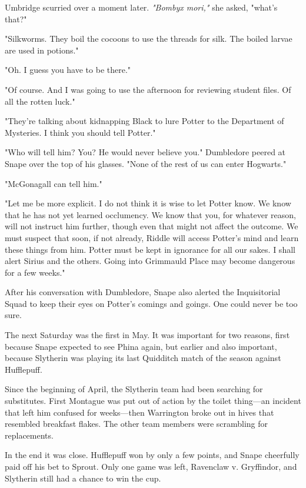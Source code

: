 Umbridge scurried over a moment later. \emph{"Bombyx mori,"} she asked, "what's that?"

"Silkworms. They boil the cocoons to use the threads for silk. The boiled larvae are used in potions."

"Oh. I guess you have to be there."

"Of course. And I was going to use the afternoon for reviewing student files. Of all the rotten luck."

\sbreak

"They're talking about kidnapping Black to lure Potter to the Department of Mysteries. I think you should tell Potter."

"Who will tell him? You? He would never believe you." Dumbledore peered at Snape over the top of his glasses. "None of the rest of us can enter Hogwarts."

"McGonagall can tell him."

"Let me be more explicit. I do not think it is wise to let Potter know. We know that he has not yet learned occlumency. We know that you, for whatever reason, will not instruct him further, though even that might not affect the outcome. We must suspect that soon, if not already, Riddle will access Potter's mind and learn these things from him. Potter must be kept in ignorance for all our sakes. I shall alert Sirius and the others. Going into Grimmauld Place may become dangerous for a few weeks."

After his conversation with Dumbledore, Snape also alerted the Inquisitorial Squad to keep their eyes on Potter's comings and goings. One could never be too sure.

The next Saturday was the first in May. It was important for two reasons, first because Snape expected to see Phina again, but earlier and also important, because Slytherin was playing its last Quidditch match of the season against Hufflepuff.

Since the beginning of April, the Slytherin team had been searching for substitutes. First Montague was put out of action by the toilet thing—an incident that left him confused for weeks—then Warrington broke out in hives that resembled breakfast flakes. The other team members were scrambling for replacements.

In the end it was close. Hufflepuff won by only a few points, and Snape cheerfully paid off his bet to Sprout. Only one game was left, Ravenclaw v. Gryffindor, and Slytherin still had a chance to win the cup.

